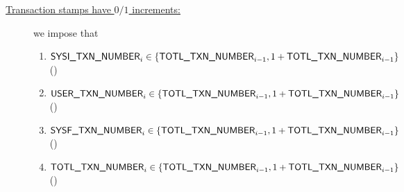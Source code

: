 \begin{description}
\[		\]
	\item[\underline{Transaction stamps have $0/1$ increments:}]
		\label{hub: system: transaction numbers: 0/1 increments}
		we impose that
		\begin{enumerate}
			\item $\textsf{SYSI}\textsf{\_}\textsf{TXN\_NUMBER}  _{i} \in \{ \textsf{TOTL}\textsf{\_}\textsf{TXN\_NUMBER} _{i - 1}, 1 + \textsf{TOTL}\textsf{\_}\textsf{TXN\_NUMBER} _{i - 1} \}$ (\sanityCheck)
			\item $\textsf{USER}\textsf{\_}\textsf{TXN\_NUMBER}  _{i} \in \{ \textsf{TOTL}\textsf{\_}\textsf{TXN\_NUMBER} _{i - 1}, 1 + \textsf{TOTL}\textsf{\_}\textsf{TXN\_NUMBER} _{i - 1} \}$ (\sanityCheck)
			\item $\textsf{SYSF}\textsf{\_}\textsf{TXN\_NUMBER}  _{i} \in \{ \textsf{TOTL}\textsf{\_}\textsf{TXN\_NUMBER} _{i - 1}, 1 + \textsf{TOTL}\textsf{\_}\textsf{TXN\_NUMBER} _{i - 1} \}$ (\sanityCheck)
		        \item $\textsf{TOTL}\textsf{\_}\textsf{TXN\_NUMBER} _{i} \in \{ \textsf{TOTL}\textsf{\_}\textsf{TXN\_NUMBER} _{i - 1}, 1 + \textsf{TOTL}\textsf{\_}\textsf{TXN\_NUMBER} _{i - 1} \}$ (\sanityCheck)
		\end{enumerate}
\end{description}
